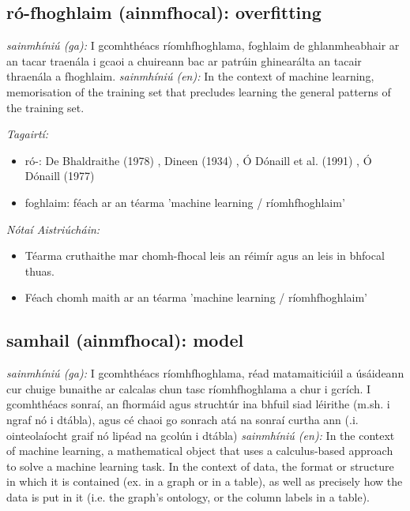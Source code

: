 \documentclass{article}
\begin{document}
\subsection*{ró-fhoghlaim (ainmfhocal): overfitting} 
 \noindent \textit{sainmhíniú (ga):} I gcomhthéacs ríomhfhoghlama, foghlaim de ghlanmheabhair ar an tacar traenála i gcaoi a chuireann bac ar patrúin ghinearálta an tacair thraenála a fhoghlaim.
\newline\newline
 \noindent \textit{sainmhíniú (en):} In the context of machine learning, memorisation of the training set that precludes learning the general patterns of the training set.
\newline

 \noindent \textit{Tagairtí:}
\begin{itemize}
	\item ró-: De Bhaldraithe (1978) \cite{de-bhaldraithe}, Dineen (1934) \cite{dineen}, Ó Dónaill et al. (1991) \cite{focloir-beag}, Ó Dónaill (1977) \cite{odonaill}
	\item foghlaim: féach ar an téarma 'machine learning / ríomhfhoghlaim'
\end{itemize}

 \noindent \textit{Nótaí Aistriúcháin:}
\begin{itemize}
	\item Téarma cruthaithe mar chomh-fhocal leis an réimír agus an leis in bhfocal thuas.
	\item Féach chomh maith ar an téarma 'machine learning / ríomhfhoghlaim'
\end{itemize}


\subsection*{samhail (ainmfhocal): model} 
 \noindent \textit{sainmhíniú (ga):} I gcomhthéacs ríomhfhoghlama, réad matamaiticiúil a úsáideann cur chuige bunaithe ar calcalas chun tasc ríomhfhoghlama a chur i gcrích. I gcomhthéacs sonraí, an fhormáid agus struchtúr ina bhfuil siad léirithe (m.sh. i ngraf nó i dtábla), agus cé chaoi go sonrach atá na sonraí curtha ann (.i. ointeolaíocht graif nó lipéad na gcolún i dtábla)
\newline\newline
 \noindent \textit{sainmhíniú (en):} In the context of machine learning, a mathematical object that uses a calculus-based approach to solve a machine learning task. In the context of data, the format or structure in which it is contained (ex. in a graph or in a table), as well as precisely how the data is put in it (i.e. the graph's ontology, or the column labels in a table).
\newline
\end{document}
